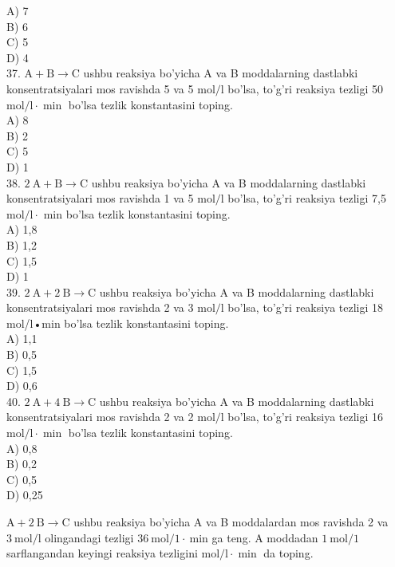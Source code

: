 A) 7\\
B) 6\\
C) 5\\
D) 4\\
37. $\mathrm{A}+\mathrm{B} \rightarrow \mathrm{C}$ ushbu reaksiya bo'yicha A va B moddalarning dastlabki konsentratsiyalari mos ravishda 5 va 5 $\mathrm{mol} / \mathrm{l}$ bo'lsa, to'g'ri reaksiya tezligi 50 $\mathrm{mol} / \mathrm{l} \cdot \min$ bo'lsa tezlik konstantasini toping.\\
A) 8\\
B) 2\\
C) 5\\
D) 1\\
38. $2 \mathrm{~A}+\mathrm{B} \rightarrow \mathrm{C}$ ushbu reaksiya bo'yicha A va B moddalarning dastlabki konsentratsiyalari mos ravishda 1 va 5 $\mathrm{mol} / \mathrm{l}$ bo'lsa, to'g'ri reaksiya tezligi 7,5 $\mathrm{mol} / \mathrm{l} \cdot$ min bo'lsa tezlik konstantasini toping.\\
A) 1,8\\
B) 1,2\\
C) 1,5\\
D) 1\\
39. $2 \mathrm{~A}+2 \mathrm{~B} \rightarrow \mathrm{C}$ ushbu reaksiya bo'yicha A va B moddalarning dastlabki konsentratsiyalari mos ravishda 2 va 3 $\mathrm{mol} / \mathrm{l}$ bo'lsa, to'g'ri reaksiya tezligi 18\\
mol/l•min bo'lsa tezlik konstantasini toping.\\
A) 1,1\\
B) 0,5\\
C) 1,5\\
D) 0,6\\
40. $2 \mathrm{~A}+4 \mathrm{~B} \rightarrow \mathrm{C}$ ushbu reaksiya bo'yicha A va B moddalarning dastlabki konsentratsiyalari mos ravishda 2 va 2 $\mathrm{mol} / \mathrm{l}$ bo'lsa, to'g'ri reaksiya tezligi 16 $\mathrm{mol} / \mathrm{l} \cdot \min$ bo'lsa tezlik konstantasini toping.\\
A) 0,8\\
B) 0,2\\
C) 0,5\\
D) 0,25
  \item $\mathrm{A}+2 \mathrm{~B} \rightarrow \mathrm{C}$ ushbu reaksiya bo'yicha A va B moddalardan mos ravishda 2 va $3 \mathrm{~mol} / \mathrm{l}$ olingandagi tezligi $36 \mathrm{~mol} / 1 \cdot \mathrm{~min}$ ga teng. A moddadan $1 \mathrm{~mol} / 1$ sarflangandan keyingi reaksiya tezligini $\mathrm{mol} / \mathrm{l} \cdot \min$ da toping.\\
